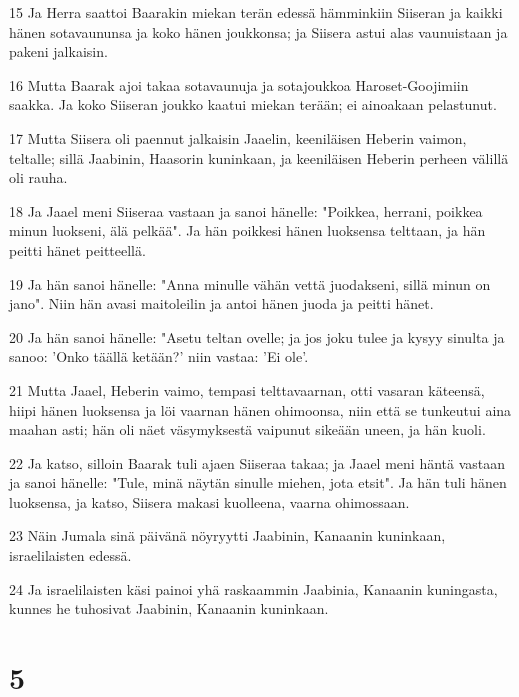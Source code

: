\par 15 Ja Herra saattoi Baarakin miekan terän edessä hämminkiin Siiseran ja kaikki hänen sotavaununsa ja koko hänen joukkonsa; ja Siisera astui alas vaunuistaan ja pakeni jalkaisin.
\par 16 Mutta Baarak ajoi takaa sotavaunuja ja sotajoukkoa Haroset-Goojimiin saakka. Ja koko Siiseran joukko kaatui miekan terään; ei ainoakaan pelastunut.
\par 17 Mutta Siisera oli paennut jalkaisin Jaaelin, keeniläisen Heberin vaimon, teltalle; sillä Jaabinin, Haasorin kuninkaan, ja keeniläisen Heberin perheen välillä oli rauha.
\par 18 Ja Jaael meni Siiseraa vastaan ja sanoi hänelle: "Poikkea, herrani, poikkea minun luokseni, älä pelkää". Ja hän poikkesi hänen luoksensa telttaan, ja hän peitti hänet peitteellä.
\par 19 Ja hän sanoi hänelle: "Anna minulle vähän vettä juodakseni, sillä minun on jano". Niin hän avasi maitoleilin ja antoi hänen juoda ja peitti hänet.
\par 20 Ja hän sanoi hänelle: "Asetu teltan ovelle; ja jos joku tulee ja kysyy sinulta ja sanoo: 'Onko täällä ketään?' niin vastaa: 'Ei ole'.
\par 21 Mutta Jaael, Heberin vaimo, tempasi telttavaarnan, otti vasaran käteensä, hiipi hänen luoksensa ja löi vaarnan hänen ohimoonsa, niin että se tunkeutui aina maahan asti; hän oli näet väsymyksestä vaipunut sikeään uneen, ja hän kuoli.
\par 22 Ja katso, silloin Baarak tuli ajaen Siiseraa takaa; ja Jaael meni häntä vastaan ja sanoi hänelle: "Tule, minä näytän sinulle miehen, jota etsit". Ja hän tuli hänen luoksensa, ja katso, Siisera makasi kuolleena, vaarna ohimossaan.
\par 23 Näin Jumala sinä päivänä nöyryytti Jaabinin, Kanaanin kuninkaan, israelilaisten edessä.
\par 24 Ja israelilaisten käsi painoi yhä raskaammin Jaabinia, Kanaanin kuningasta, kunnes he tuhosivat Jaabinin, Kanaanin kuninkaan.

\chapter{5}

